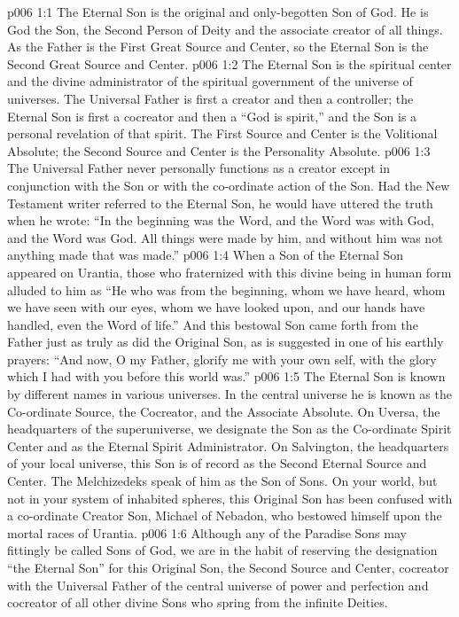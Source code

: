\vs p006 1:1 The Eternal Son is the original and only\hyp{}begotten Son of God. He is God the Son, the Second Person of Deity and the associate creator of all things. As the Father is the First Great Source and Center, so the Eternal Son is the Second Great Source and Center.
\vs p006 1:2 The Eternal Son is the spiritual center and the divine administrator of the spiritual government of the universe of universes. The Universal Father is first a creator and then a controller; the Eternal Son is first a cocreator and then a  “God is spirit,” and the Son is a personal revelation of that spirit. The First Source and Center is the Volitional Absolute; the Second Source and Center is the Personality Absolute.
\vs p006 1:3 The Universal Father never personally functions as a creator except in conjunction with the Son or with the co\hyp{}ordinate action of the Son. Had the New Testament writer referred to the Eternal Son, he would have uttered the truth when he wrote: “In the beginning was the Word, and the Word was with God, and the Word was God. All things were made by him, and without him was not anything made that was made.”
\vs p006 1:4 When a Son of the Eternal Son appeared on Urantia, those who fraternized with this divine being in human form alluded to him as “He who was from the beginning, whom we have heard, whom we have seen with our eyes, whom we have looked upon, and our hands have handled, even the Word of life.” And this bestowal Son came forth from the Father just as truly as did the Original Son, as is suggested in one of his earthly prayers: \textcolor{ubdarkred}{“And now, O my Father, glorify me with your own self, with the glory which I had with you before this world was.”}
\pc \vs p006 1:5 The Eternal Son is known by different names in various universes. In the central universe he is known as the Co\hyp{}ordinate Source, the Cocreator, and the Associate Absolute. On Uversa, the headquarters of the superuniverse, we designate the Son as the Co\hyp{}ordinate Spirit Center and as the Eternal Spirit Administrator. On Salvington, the headquarters of your local universe, this Son is of record as the Second Eternal Source and Center. The Melchizedeks speak of him as the Son of Sons. On your world, but not in your system of inhabited spheres, this Original Son has been confused with a co\hyp{}ordinate Creator Son, Michael of Nebadon, who bestowed himself upon the mortal races of Urantia.
\vs p006 1:6 Although any of the Paradise Sons may fittingly be called Sons of God, we are in the habit of reserving the designation “the Eternal Son” for this Original Son, the Second Source and Center, cocreator with the Universal Father of the central universe of power and perfection and cocreator of all other divine Sons who spring from the infinite Deities.
